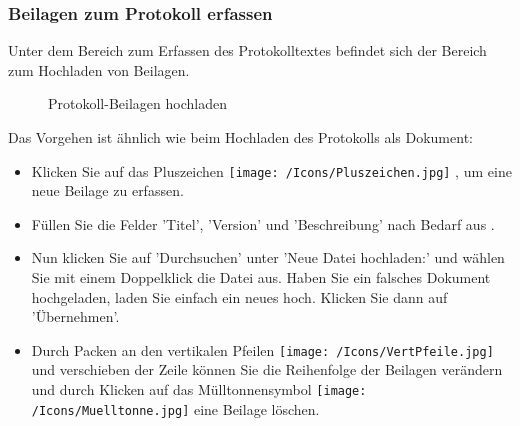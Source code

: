 \subsubsection{Beilagen zum Protokoll erfassen}

Unter dem Bereich zum Erfassen des Protokolltextes befindet sich der Bereich zum Hochladen von Beilagen.

\begin{figure}[H]
\caption{Protokoll-Beilagen hochladen}
\end{figure}

Das Vorgehen ist ähnlich wie beim Hochladen des Protokolls als Dokument:

\begin{itemize}
\item
Klicken Sie auf das Pluszeichen \texttt{[image: /Icons/Pluszeichen.jpg]} , um eine neue Beilage zu erfassen.
\item
Füllen Sie die Felder 'Titel', 'Version' und 'Beschreibung' nach Bedarf aus .
\item
Nun klicken Sie auf 'Durchsuchen'  unter 'Neue Datei hochladen:' und wählen Sie mit einem Doppelklick die Datei aus. Haben Sie ein falsches Dokument hochgeladen, laden Sie einfach ein neues hoch. Klicken Sie dann auf 'Übernehmen'.
\item
Durch Packen an den vertikalen Pfeilen \texttt{[image: /Icons/VertPfeile.jpg]}  und verschieben der Zeile können Sie die Reihenfolge der Beilagen verändern und durch Klicken auf das Mülltonnensymbol \texttt{[image: /Icons/Muelltonne.jpg]}  eine Beilage löschen.
\end{itemize}

